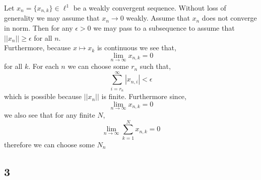 \documentclass[12pt]{article}
\begin{document}
Let $x_n = \{ x_{n,k} \} \in \ell^1$ be a weakly convergent sequence. Without loss of generality we may assume that $x_n \to 0$ weakly. Assume that $x_n$ does not converge in norm. Then for any $\epsilon > 0$ we may pass to a subsequence to assume that $ || x_n || \ge \epsilon$ for all $n$. 
\bigskip\\
Furthermore, because $x \mapsto x_k$ is continuous we see that,
\[ \lim_{n \to \infty} x_{n,k} = 0 \]
for all $k$. For each $n$ we can choose some $r_n$ such that,
\[ \sum_{i = r_n}^\infty | x_{n,i} | < \epsilon \]
which is possible because $|| x_{n} ||$ is finite. Furthermore since,
\[ \lim_{n \to \infty} x_{n,k} = 0 \]
we also see that for any finite $N$,
\[ \lim_{n \to \infty} \sum_{k = 1}^N x_{n,k} = 0 \]
therefore we can choose some $N_n$


\subsection{3}
\end{document}
